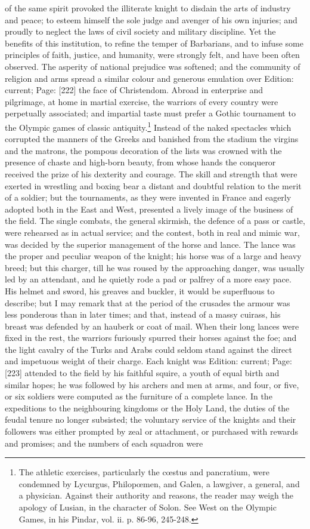 of the same spirit provoked the illiterate knight to disdain the arts of industry and peace; to esteem himself the sole judge and avenger of his own injuries; and proudly to neglect the laws of civil society and military discipline. Yet the benefits of this institution, to refine the temper of Barbarians, and to infuse some principles of faith, justice, and humanity, were strongly felt, and have been often observed. The asperity of national prejudice was softened; and the community of religion and arms spread a similar colour and generous emulation over Edition: current; Page: [222] the face of Christendom. Abroad in enterprise and pilgrimage, at home in martial exercise, the warriors of every country were perpetually associated; and impartial taste must prefer a Gothic tournament to the Olympic games of classic antiquity.\footnote{The athletic exercises, particularly the cœstus and pancratium, were condemned by Lycurgus, Philopœmen, and Galen, a lawgiver, a general, and a physician. Against their authority and reasons, the reader may weigh the apology of Lusian, in the character of Solon. See West on the Olympic Games, in his Pindar, vol. ii. p. 86-96, 245-248.} Instead of the naked spectacles which corrupted the manners of the Greeks and banished from the stadium the virgins and the matrons, the pompous decoration of the lists was crowned with the presence of chaste and high-born beauty, from whose hands the conqueror received the prize of his dexterity and courage. The skill and strength that were exerted in wrestling and boxing bear a distant and doubtful relation to the merit of a soldier; but the tournaments, as they were invented in France and eagerly adopted both in the East and West, presented a lively image of the business of the field. The single combats, the general skirmish, the defence of a pass or castle, were rehearsed as in actual service; and the contest, both in real and mimic war, was decided by the superior management of the horse and lance. The lance was the proper and peculiar weapon of the knight; his horse was of a large and heavy breed; but this charger, till he was roused by the approaching danger, was usually led by an attendant, and he quietly rode a pad or palfrey of a more easy pace. His helmet and sword, his greaves and buckler, it would be superfluous to describe; but I may remark that at the period of the crusades the armour was less ponderous than in later times; and that, instead of a massy cuirass, his breast was defended by an hauberk or coat of mail. When their long lances were fixed in the rest, the warriors furiously spurred their horses against the foe; and the light cavalry of the Turks and Arabs could seldom stand against the direct and impetuous weight of their charge. Each knight was Edition: current; Page: [223] attended to the field by his faithful squire, a youth of equal birth and similar hopes; he was followed by his archers and men at arms, and four, or five, or six soldiers were computed as the furniture of a complete lance. In the expeditions to the neighbouring kingdoms or the Holy Land, the duties of the feudal tenure no longer subsisted; the voluntary service of the knights and their followers was either prompted by zeal or attachment, or purchased with rewards and promises; and the numbers of each squadron were 